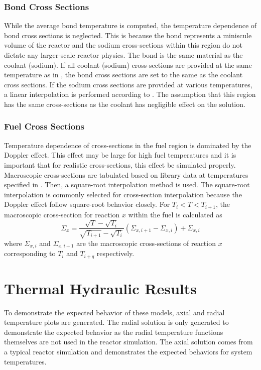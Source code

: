     \subsubsection{Bond Cross Sections}
      While the average bond temperature is computed, the temperature dependence
      of bond cross sections is neglected. This is because the bond represents a
      miniscule volume of the reactor and the sodium cross-sections within this
      region do not dictate any larger-scale reactor physics. The bond is the 
      same material as the coolant (sodium). If all coolant (sodium) 
      cross-sections are provided at the same temperature as in 
      , the bond cross sections are set to the same as the 
      coolant cross sections. If the sodium cross sections are provided at
      various temperatures, a linear interpolation is performed according to
      . The assumption that this region has the
      same cross-sections as the coolant has negligible effect on the solution.

    \subsubsection{Fuel Cross Sections}
      Temperature dependence of cross-sections in the fuel region is dominated
      by the Doppler effect. This effect may be large for high fuel temperatures
      and it is important that for realistic cross-sections, this effect be
      simulated properly. Macroscopic cross-sections are tabulated based on
      library data at temperatures specified in . Then, a
      square-root interpolation method is used. The square-root interpolation is
      commonly selected for cross-section interpolation because the Doppler
      effect follow square-root behavior closely. For $T_i < T < T_{i+1}$, the
      macroscopic cross-section for reaction $x$ within the fuel is calculated
      as
      \begin{equation}
        \Sigma_{x} = 
          \frac{\sqrt{T} - \sqrt{T_{i}}}{\sqrt{T_{i+1}}-\sqrt{T_{i}}}
          (\Sigma_{x,i+1} - \Sigma_{x,i})  + \Sigma_{x,i}
      \end{equation}
      where $\Sigma_{x,i}$ and $\Sigma_{x,i+1}$ are the macroscopic
      cross-sections of reaction $x$ corresponding to $T_i$ and $T_{i+q}$
      respectively.
      
\section{Thermal Hydraulic Results}
  To demonstrate the expected behavior of these models, axial and radial
  temperature plots are generated. The radial solution is only generated to
  demonstrate the expected behavior as the radial temperature functions
  themselves are not used in the reactor simulation. The axial solution comes
  from a typical reactor simulation and demonstrates the expected behaviors for
  system temperatures.

